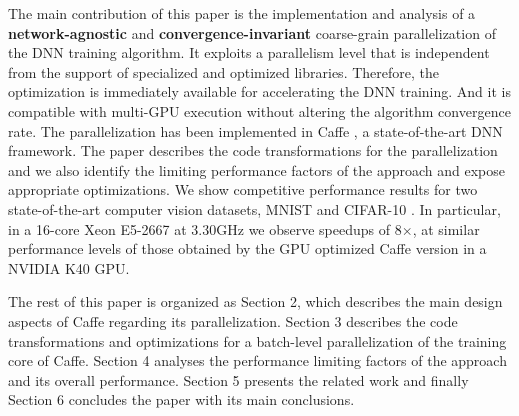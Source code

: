 The main contribution of this paper is the implementation and
analysis of a \textbf{network-agnostic} and \textbf{convergence-invariant} 
coarse-grain parallelization of the DNN training algorithm.
It exploits a parallelism level that is independent from the
support of specialized and optimized libraries. Therefore, the
optimization is immediately available for accelerating the DNN
training. And it is compatible with multi-GPU execution without 
altering the algorithm convergence rate. The parallelization has 
been implemented in Caffe \cite{Caffe}, a state-of-the-art DNN framework. 
The paper describes the code transformations for the parallelization 
and we also identify the limiting performance factors of the
approach and expose appropriate optimizations. We show competitive 
performance results for two state-of-the-art computer vision
datasets, MNIST \cite{MNIST,Deng2012} and CIFAR-10 \cite{CIFAR10}. 
In particular, in a 16-core Xeon E5-2667 
at 3.30GHz we observe speedups of 8$\times$, at similar performance levels 
of those obtained by the GPU optimized Caffe version in a NVIDIA K40 GPU.

The rest of this paper is organized as Section 2, which 
describes the main design aspects of Caffe regarding its 
parallelization. Section 3 describes the code transformations 
and optimizations for a batch-level parallelization of the 
training core of Caffe. Section 4 analyses the performance 
limiting factors of the approach and its overall performance. 
Section 5 presents the related work and finally Section 6 
concludes the paper with its main conclusions.

